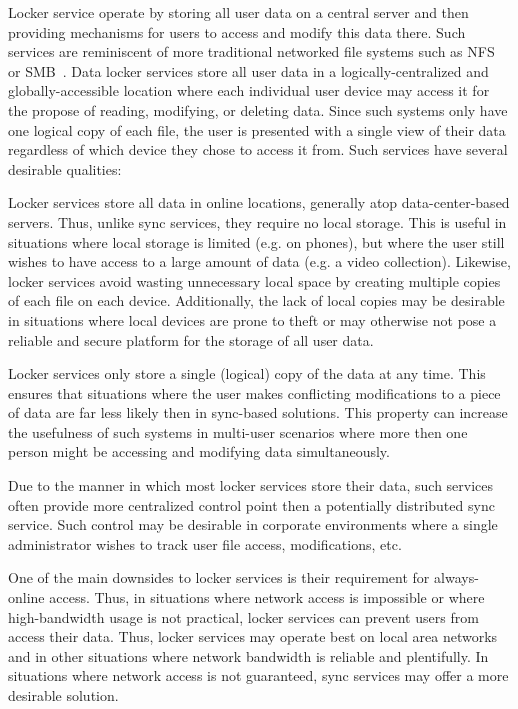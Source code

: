 Locker service operate by storing all user data on a central server
and then providing mechanisms for users to access and modify this data
there. Such services are reminiscent of more traditional networked
file systems such as NFS~\cite{sandberg1985} or
SMB~\cite{microsoft-smb2}. Data locker services store all user data in
a logically-centralized and globally-accessible location where each
individual user device may access it for the propose of reading,
modifying, or deleting data. Since such systems only have one logical
copy of each file, the user is presented with a single view of their
data regardless of which device they chose to access it from. Such
services have several desirable qualities:

\begin{packed_desc}
\item[No Local Storage:] Locker services store all data in online
  locations, generally atop data-center-based servers. Thus, unlike
  sync services, they require no local storage. This is useful in
  situations where local storage is limited (e.g. on phones), but
  where the user still wishes to have access to a large amount of data
  (e.g. a video collection). Likewise, locker services avoid wasting
  unnecessary local space by creating multiple copies of each file on
  each device. Additionally, the lack of local copies may be desirable
  in situations where local devices are prone to theft or may
  otherwise not pose a reliable and secure platform for the storage of
  all user data.
\item[Single Source of Truth:] Locker services only store a single
  (logical) copy of the data at any time. This ensures that situations
  where the user makes conflicting modifications to a piece of data
  are far less likely then in sync-based solutions. This property can
  increase the usefulness of such systems in multi-user scenarios
  where more then one person might be accessing and modifying data
  simultaneously.
\item[Centralized Control:] Due to the manner in which most locker
  services store their data, such services often provide more
  centralized control point then a potentially distributed sync
  service. Such control may be desirable in corporate environments
  where a single administrator wishes to track user file access,
  modifications, etc.
\end{packed_desc}

One of the main downsides to locker services is their requirement for
always-online access. Thus, in situations where network access is
impossible or where high-bandwidth usage is not practical, locker
services can prevent users from access their data. Thus, locker
services may operate best on local area networks and in other
situations where network bandwidth is reliable and plentifully. In
situations where network access is not guaranteed, sync services may
offer a more desirable solution.

